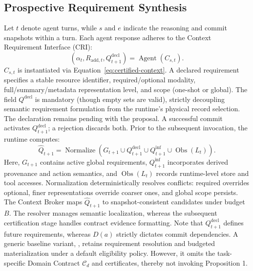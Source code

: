 \subsection{Prospective Requirement Synthesis}
Let $t$ denote agent turns, while $s$ and $e$ indicate the reasoning and commit snapshots within a turn. Each agent response adheres to the Context Requirement Interface (CRI):
\begin{equation}
(\alpha_t,R_{\mathrm{add},t},Q^{\mathrm{decl}}_{t+1})
=\operatorname{Agent}(C_{s,t}).
\label{eq:cri-output}
\end{equation}
$C_{s,t}$ is instantiated via Equation~\eqref{eq:certified-context}. A declared requirement specifies a stable resource identifier, required/optional modality, full/summary/metadata representation level, and scope (one-shot or global). The field $Q^{\mathrm{decl}}$ is mandatory (though empty sets are valid), strictly decoupling semantic requirement formulation from the runtime's physical record selection.
The declaration remains pending with the proposal. A successful commit activates $Q^{\mathrm{decl}}_{t+1}$; a rejection discards both. Prior to the subsequent invocation, the runtime computes:
\begin{equation}
\widehat Q_{t+1}=\operatorname{Normalize}\!\left(
G_{t+1}\cup Q^{\mathrm{decl}}_{t+1}\cup Q^{\mathrm{inf}}_{t+1}
\cup\operatorname{Obs}(L_t)\right).
\label{eq:prospective-read-set}
\end{equation}
Here, $G_{t+1}$ contains active global requirements, $Q^{\mathrm{inf}}_{t+1}$ incorporates derived provenance and action semantics, and $\operatorname{Obs}(L_t)$ records runtime-level store and tool accesses. Normalization deterministically resolves conflicts: required overrides optional, finer representations override coarser ones, and global scope persists.
The Context Broker maps $\widehat Q_{t+1}$ to snapshot-consistent candidates under budget $B$. The resolver manages semantic localization, whereas the subsequent certification stage handles contract evidence formatting. Note that $Q^{\mathrm{decl}}_{t+1}$ defines future requirements, whereas $D(a)$ strictly dictates commit dependencies.
A generic baseline variant, \methodCRI{}, retains requirement resolution and budgeted materialization under a default eligibility policy. However, it omits the task-specific Domain Contract $\mathcal C_d$ and certificates, thereby not invoking Proposition 1.
